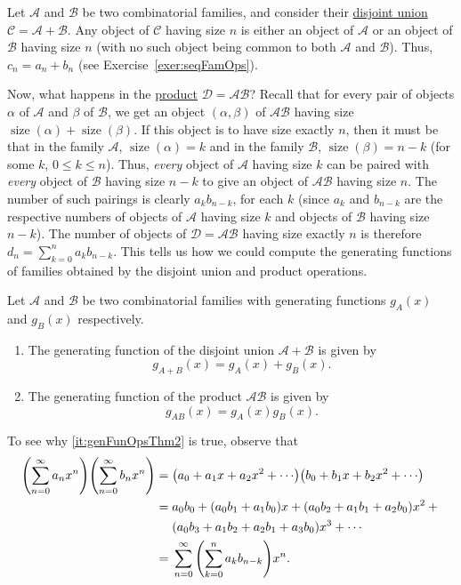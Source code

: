 \documentclass[11pt,a5paper]{amsart}
\newcommand{\cat}{\mathcal}
\DeclareMathOperator{\size}{size}
\begin{document}
Let $\cat A$ and $\cat B$ be two combinatorial families, and consider their \hyperref[def:disjUnionFam]{disjoint union} $\cat C = \cat A + \cat B$. Any object of $\cat C$ having size $n$ is either an object of $\cat A$ or an object of $\cat B$ having size $n$ (with no such object being common to both $\cat A$ and $\cat B$). Thus, $c_n = a_n + b_n$ (see Exercise~\ref{exer:seqFamOps}).

Now, what happens in the \hyperref[def:prodFam]{product} $\cat D = \cat A \cat B$? Recall that for every pair of objects $\alpha$ of $\cat A$ and $\beta$ of $\cat B$, we get an object $(\alpha, \beta)$ of $\cat A \cat B$ having size $\size(\alpha) + \size(\beta)$. If this object is to have size exactly $n$, then it must be that in the family $\cat A$, $\size(\alpha) = k$ and in the family $\cat B$, $\size(\beta) = n - k$ (for some $k$, $0 \le k \le n$). Thus, \emph{every} object of $\cat A$ having size $k$ can be paired with \emph{every} object of $\cat B$ having size $n - k$ to give an object of $\cat A \cat B$ having size $n$. The number of such pairings is clearly $a_k b_{n - k}$, for each $k$ (since $a_k$ and $b_{n - k}$ are the respective numbers of objects of $\cat A$ having size $k$ and objects of $\cat B$ having size $n - k$). The number of objects of $\cat D = \cat A \cat B$ having size exactly $n$ is therefore $d_n = \sum\limits_{k = 0}^n a_k b_{n - k}$. This tells us how we could compute the generating functions of families obtained by the disjoint union and product operations.
\begin{Theorem}[label=thm:genFunOps]
Let $\cat A$ and $\cat B$ be two combinatorial families with generating functions $g_A(x)$ and $g_B(x)$ respectively.
\begin{enumerate}[label=(\roman*)]
	\item\label{it:genFunOpsThm1} The generating function of the disjoint union $\cat A + \cat B$ is given by
	\begin{equation*}
	g_{A + B}(x) = g_A(x) + g_B(x).
	\end{equation*}
	\item\label{it:genFunOpsThm2} The generating function of the product $\cat A \cat B$ is given by
	\begin{equation*}
	g_{AB}(x) = g_A(x)g_B(x).
	\end{equation*}
\end{enumerate}
\end{Theorem}
To see why \ref{it:genFunOpsThm2} is true, observe that
\begin{align*}
\pqty{\sum_{n = 0}^\infty a_n x^n} \pqty{\sum_{n = 0}^\infty b_n x^n} = {}& \pqty{a_0 + a_1 x + a_2 x^2 + \cdots} \pqty{b_0 + b_1 x + b_2 x^2 + \cdots} \\
	= {}& a_0 b_0 + (a_0 b_1 + a_1 b_0) x + (a_0 b_2 + a_1 b_1 + a_2 b_0) x^2 + {} \\
	& (a_0 b_3 + a_1 b_2 + a_2 b_1 + a_3 b_0) x^3 + \cdots \\
	= {}& \sum_{n = 0}^\infty \pqty{\sum_{k = 0}^n a_k b_{n-k}} x^n.
\end{align*}
\end{document}

